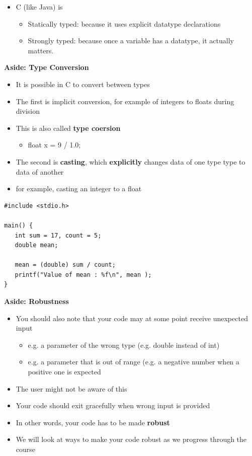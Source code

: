 \documentclass{beamer}
\begin{document}
\begin{frame}
\begin{itemize}
\item C (like Java) is

\begin{itemize}
\item Statically typed: because it uses explicit datatype declarations 
\item Strongly typed: because once a variable has a datatype, it actually matters. 
\end{itemize}
\end{itemize}
\end{frame}

\begin{frame}[fragile]
\textbf{Aside: Type Conversion}
\begin{itemize}
\item It is possible in C to convert between types
\item The first is implicit conversion, for example of integers to floats during division
\item This is also called \textbf{type coersion}
\begin{itemize}
\item float x = 9 / 1.0;
\end{itemize}
\item The second is \textbf{casting}, which \textbf{explicitly} changes data of one type  type to data of another
\item for example, casting an integer to a float
\end{itemize}
\begin{block}{}
\begin{lstlisting}
#include <stdio.h>

main() {
   int sum = 17, count = 5;
   double mean;

   mean = (double) sum / count;
   printf("Value of mean : %f\n", mean );
}
\end{lstlisting}
\end{block}
\end{frame}

\begin{frame}
\textbf{Aside: Robustness}
\begin{itemize}
\item You should also note that your code may at some point receive unexpected input 
\begin{itemize}
\item e.g. a parameter of the wrong type (e.g. double instead of int)
\item e.g. a parameter that is out of range (e.g. a negative number when a positive one is expected
\end{itemize}
\item The user might not be aware of this
\item Your code should exit gracefully when wrong input is provided
\item In other words, your code has to be made \textbf{robust}
\item We will look at ways to make your code robust as we progress through the course
\end{itemize}
\end{frame}
\end{document}
